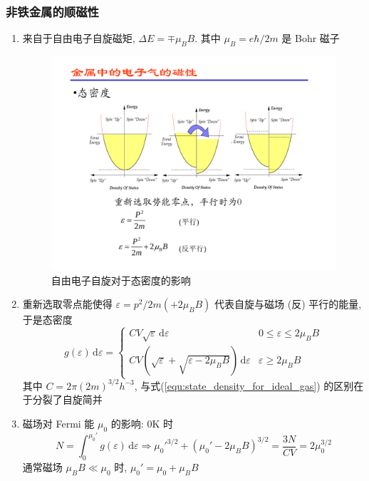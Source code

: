 \documentclass[12pt,a4paper]{article}%
\numberwithin{equation}{section}
\newcommand{\diff}{\,\mathrm{d}}
\begin{document}
\subsubsection{非铁金属的顺磁性} %
\label{ssub:paramagnetic_for_electron}
\begin{enumerate}
    \item 来自于自由电子自旋磁矩, $\Delta E = \mp \mu_B B$. 其中 $\mu_B = e\hbar/2m$ 是 Bohr 磁子
    \begin{figure}[!ht]
     \centering
     \includegraphics[width=0.8\linewidth]{paramag_fermi.pdf}
     \caption{自由电子自旋对于态密度的影响\label{fig:paramag_fermi}}
    \end{figure}
    \item 重新选取零点能使得 $\varepsilon = p^2/2m (+2\mu_BB)$ 代表自旋与磁场 (反) 平行的能量, 于是态密度
    \begin{equation}
        g(\varepsilon)\diff\varepsilon = \begin{cases}
            CV\sqrt\varepsilon\diff\varepsilon & 0\le\varepsilon\le 2\mu_BB\\
            CV\left(\sqrt\varepsilon + \sqrt{\varepsilon-2\mu_BB}\right)\diff\varepsilon & \varepsilon\ge 2\mu_BB
        \end{cases}
    \end{equation}
    其中 $C = 2\pi(2m)^{3/2}h^{-3}$, 与式(\ref{equ:state_density_for_ideal_gas}) 的区别在于分裂了自旋简并
    \item 磁场对 Fermi 能 $\mu_0$ 的影响: $0$K 时
    \begin{equation}
        N = \int_0^{\mu_0'}g(\varepsilon)\diff\varepsilon \Rightarrow
        \mu_0'^{3/2} + (\mu_0'-2\mu_BB)^{3/2} 
        = \frac{3N}{CV} = 2\mu_0^{3/2}
    \end{equation}
    通常磁场 $\mu_BB\ll\mu_0$ 时, $\mu_0' = \mu_0+\mu_BB$

\end{enumerate}
\end{document}
